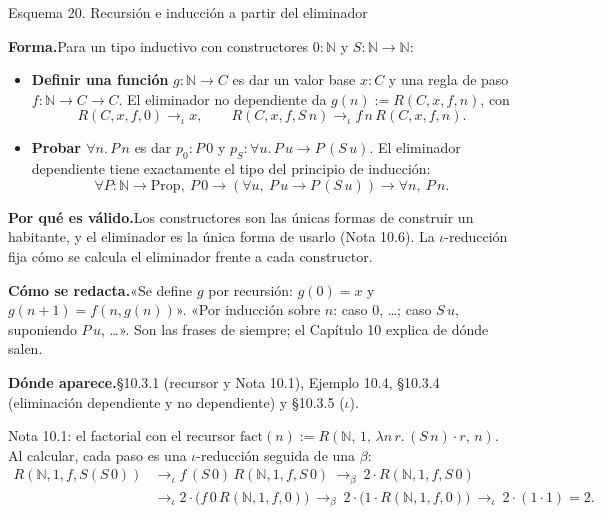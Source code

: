 \documentclass[11pt,a4paper]{article}
\newcommand{\forma}{\par\noindent\textbf{Forma.}\enspace}
\newcommand{\porque}{\par\smallskip\noindent\textbf{Por qué es válido.}\enspace}
\newcommand{\plantilla}{\par\smallskip\noindent\textbf{Cómo se redacta.}\enspace}
\newcommand{\donde}{\par\smallskip\noindent\textbf{Dónde aparece.}\enspace}
\begin{document}
\begin{esquema}{Esquema 20. Recursión e inducción a partir del eliminador}\label{esq:elim}
\forma Para un tipo inductivo con constructores \(0:\mathbb N\) y
\(S:\mathbb N\to\mathbb N\):
\begin{itemize}
  \item \textbf{Definir una función} \(g:\mathbb N\to C\) es dar un valor base
    \(x:C\) y una regla de paso \(f:\mathbb N\to C\to C\). El eliminador no
    dependiente da \(g(n):=R(C,x,f,n)\), con
    \[
    R(C,x,f,0)\to_\iota x,\qquad R(C,x,f,S\,n)\to_\iota f\,n\,R(C,x,f,n).
    \]
  \item \textbf{Probar \(\forall n.\,P\,n\)} es dar \(p_0:P\,0\) y
    \(p_S:\forall u.\,P\,u\to P\,(S\,u)\). El eliminador dependiente tiene
    exactamente el tipo del principio de inducción:
    \[
    \forall P:\mathbb N\to\mathrm{Prop},\ P\,0\to(\forall u,\ P\,u\to P\,(S\,u))\to\forall n,\ P\,n.
    \]
\end{itemize}

\porque Los constructores son las únicas formas de construir un habitante, y
el eliminador es la única forma de usarlo (Nota 10.6). La \(\iota\)-reducción
fija cómo se calcula el eliminador frente a cada constructor.

\plantilla «Se define \(g\) por recursión: \(g(0)=x\) y \(g(n+1)=f(n,g(n))\)».
«Por inducción sobre \(n\): caso \(0\), \dots; caso \(S\,u\), suponiendo
\(P\,u\), \dots». Son las frases de siempre; el Capítulo 10 explica de dónde
salen.

\donde §10.3.1 (recursor y Nota 10.1), Ejemplo 10.4, §10.3.4
(eliminación dependiente y no dependiente) y §10.3.5 (\(\iota\)).
\end{esquema}

\begin{ejemplotesis}{Nota 10.1: el factorial con el recursor}
\(\mathrm{fact}(n):=R(\mathbb N,\,1,\,\lambda n\,r.\,(S\,n)\cdot r,\,n)\). Al
calcular, cada paso es una \(\iota\)-reducción seguida de una \(\beta\):
\[
\begin{aligned}
R(\mathbb N,1,f,S(S\,0))
&\to_\iota f\,(S\,0)\,R(\mathbb N,1,f,S\,0)
\ \to_\beta\ 2\cdot R(\mathbb N,1,f,S\,0)\\
&\to_\iota 2\cdot\big(f\,0\,R(\mathbb N,1,f,0)\big)
\ \to_\beta\ 2\cdot\big(1\cdot R(\mathbb N,1,f,0)\big)
\ \to_\iota\ 2\cdot(1\cdot 1)=2.
\end{aligned}
\]
\end{ejemplotesis}
\end{document}
